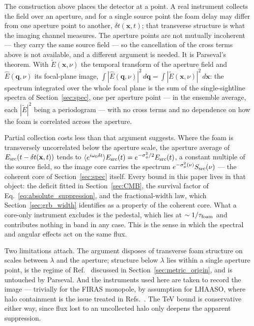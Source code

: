 \documentclass[aps,prd,onecolumn,amsmath,amssymb]{revtex4-2}
\begin{document}
The construction above places the detector at a point.  A real
instrument collects the field over an aperture, and for a single source point
the foam delay may differ from one aperture point to another,
$\delta t(\mathbf{x},t)$; that transverse structure is what the imaging
channel measures.  The aperture points are not mutually incoherent --- they
carry the same source field --- so the cancellation of the cross terms above
is not available, and a different argument is needed.  It is Parseval's
theorem.  With $\tilde E(\mathbf{x},\nu)$ the temporal transform of the
aperture field and $\hat E(\mathbf{q},\nu)$ its focal-plane image,
$\int|\hat E(\mathbf{q},\nu)|^2\,d\mathbf{q}
=\int|\tilde E(\mathbf{x},\nu)|^2\,d\mathbf{x}$: the spectrum integrated over
the whole focal plane is the sum of the single-sightline spectra of
Section~\ref{sec:spec}, one per aperture point --- in the ensemble average,
each $|\tilde E|^2$ being a periodogram --- with no cross terms and no
dependence on how the foam is correlated across the aperture.

Partial collection costs less than that argument suggests.  Where the
foam is transversely uncorrelated below the aperture scale, the aperture
average of $E_{\rm src}(t-\delta t(\mathbf{x},t))$ tends to
$\langle e^{i\omega_0\delta t}\rangle E_{\rm src}(t)
=e^{-\sigma_\phi^2/2}E_{\rm src}(t)$, a constant multiple of the source field,
so the image core carries the spectrum
$e^{-\sigma_\phi^2(\nu)}S_{\rm src}(\nu)$ --- the coherent core of
Section~\ref{sec:spec} itself.  Every bound in this paper lives in that
object: the deficit fitted in Section~\ref{sec:CMB}, the survival factor of
Eq.~\eqref{eq:absolute_suppression}, and the fractional-width law, which
Section~\ref{sec:grb_width} identifies as a property of the coherent core.
What a core-only instrument excludes is the pedestal, which lies at
$\sim1/\tau_{\rm foam}$ and contributes nothing in band in any case.  This is
the sense in which the spectral and angular effects act on the same flux.

Two limitations attach.  The argument disposes of transverse foam
structure on scales between $\lambda$ and the aperture; structure below
$\lambda$ lies within a single aperture point, is the regime of
Ref.~\cite{ChenWenMa2014} discussed in Section~\ref{sec:metric_origin}, and is
untouched by Parseval.  And the instruments used here are taken to record the
image --- trivially for the FIRAS monopole, by assumption for LHAASO, where
halo containment is the issue treated in
Refs.~\cite{Steinbring2007,Steinbring2015}.  The TeV bound is conservative
either way, since flux lost to an uncollected halo only deepens the apparent
suppression.
\end{document}
